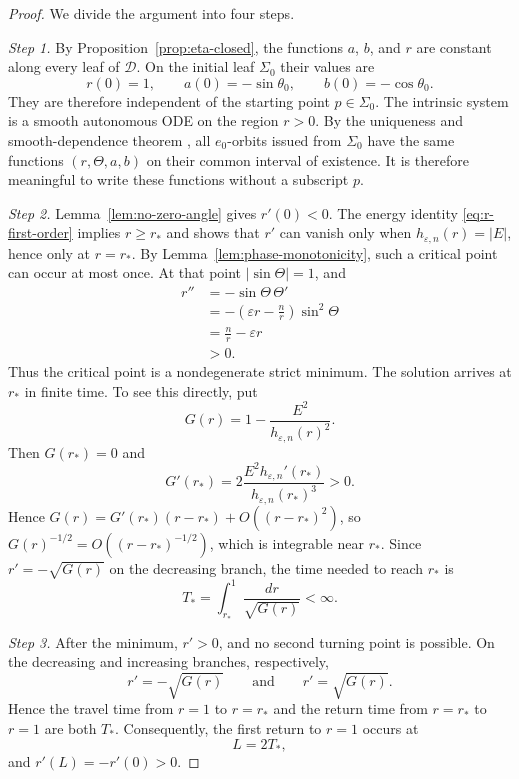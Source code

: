 \documentclass[11pt,a4paper]{article}
\numberwithin{equation}{section}
\newcommand{\Dcal}{\mathcal D}
\begin{document}
\begin{proof}
We divide the argument into four steps.

\smallskip
\noindent\emph{Step 1.}
By Proposition~\ref{prop:eta-closed}, the functions $a$, $b$, and $r$ are
constant along every leaf of $\Dcal$.  On the initial leaf $\Sigma_0$ their
values are
$$
        r(0)=1,
        \qquad
        a(0)=-\sin\theta_0,
        \qquad
        b(0)=-\cos\theta_0.
$$
They are therefore independent of the starting point $p\in\Sigma_0$.  The
intrinsic system is a smooth autonomous ODE on the region $r>0$.  By the
uniqueness and smooth-dependence theorem
\cite[Chapter~1]{CoddingtonLevinson1955}, all $e_0$-orbits issued from
$\Sigma_0$ have the same functions $(r,\Theta,a,b)$ on their common interval
of existence.  It is therefore meaningful to write these functions without a
subscript $p$.

\smallskip
\noindent\emph{Step 2.}
Lemma~\ref{lem:no-zero-angle} gives $r'(0)<0$.  The energy identity
\eqref{eq:r-first-order} implies $r\ge r_*$ and shows that $r'$ can vanish only
when $h_{\varepsilon,n}(r)=|E|$, hence only at $r=r_*$.  By
Lemma~\ref{lem:phase-monotonicity}, such a critical point can occur at most
once.  At that point $|\sin\Theta|=1$, and
$$
\begin{aligned}
        r''
        &=-\sin\Theta\,\Theta'\\
        &=-\left(\varepsilon r-\frac nr\right)\sin^2\Theta\\
        &=\frac nr-\varepsilon r
        \\&>0.
\end{aligned}
$$
Thus the critical point is a nondegenerate strict minimum.  The solution
arrives at $r_*$ in finite time.  To see this directly, put
$$
        G(r)=1-\frac{E^2}{h_{\varepsilon,n}(r)^2}.
$$
Then $G(r_*)=0$ and
$$
        G'(r_*)
        =2\frac{E^2h_{\varepsilon,n}'(r_*)}{h_{\varepsilon,n}(r_*)^3}>0.
$$
Hence $G(r)=G'(r_*)(r-r_*)+O((r-r_*)^2)$, so
$G(r)^{-1/2}=O((r-r_*)^{-1/2})$, which is integrable near \(r_*\). Since \(r'=-\sqrt{G(r)}\) on the
decreasing branch, the time needed to reach \(r_*\) is
\[
T_*=\int_{r_*}^{1}\frac{dr}{\sqrt{G(r)}}<\infty.
\]

\smallskip
\noindent\emph{Step 3.}
After the minimum, \(r'>0\), and no second turning point is
possible. On the decreasing and increasing branches, respectively,
\[
r'=-\sqrt{G(r)}
\qquad\text{and}\qquad
r'=\sqrt{G(r)}.
\]
Hence the travel time from \(r=1\) to \(r=r_*\) and the return
time from \(r=r_*\) to \(r=1\) are both
\(T_*\). Consequently, the first return to \(r=1\) occurs at
\[
L=2T_*,
\]
and \(r'(L)=-r'(0)>0\).


\end{proof}
\end{document}

